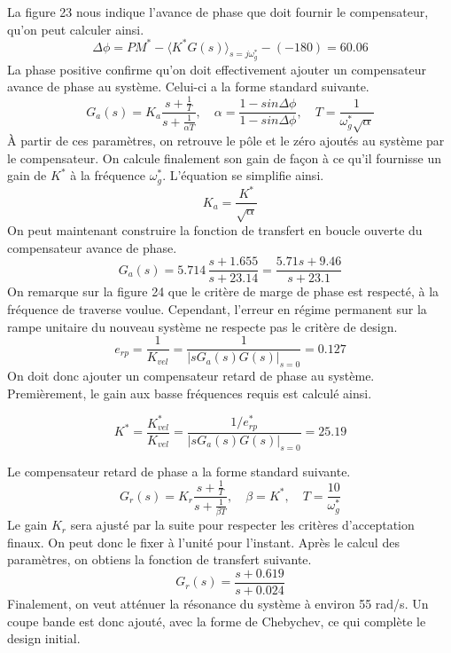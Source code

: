 \documentclass{udes_rapport} %
\begin{document}
La figure 23 nous indique l'avance de phase que doit fournir le compensateur, qu'on peut calculer ainsi.
\[ \Delta \phi = PM^* - \langle K^*G(s)\rangle_{s=j\omega_g^*} -(-180)=60.06\] 
La phase positive confirme qu'on doit effectivement ajouter un compensateur avance de phase au système. Celui-ci a la forme standard suivante.
 \[ G_a(s)=K_a\frac{s+\frac{1}{T}}{s+\frac{1}{\alpha T}}, \quad \alpha = \frac{1-sin\Delta\phi}{1-sin\Delta\phi}, \quad T = \frac{1}{\omega_g^*\sqrt{\alpha}}\]
 À partir de ces paramètres, on retrouve le pôle et le zéro ajoutés au système par le compensateur. On calcule finalement son gain de façon à ce qu'il fournisse un gain de $K^*$ à la fréquence $\omega_g^*$. L'équation se simplifie ainsi.
 \[K_a = \frac{K^*}{\sqrt{\alpha}}\]
On peut maintenant construire la fonction de transfert en boucle ouverte du compensateur avance de phase.
\[ G_a(s) = 5.714\,\frac{s+1.655}{s+23.14} = \frac{5.71s+9.46}{s+23.1} \]
On remarque sur la figure 24 que le critère de marge de phase est respecté, à la fréquence de traverse voulue.
Cependant, l'erreur en régime permanent sur la rampe unitaire du nouveau système ne respecte pas le critère de design.
\[ e_{rp} = \frac{1}{K_{vel}} = \frac{1}{|sG_a(s)G(s)|_{s=0}}=0.127 \]
On doit donc ajouter un compensateur retard de phase au système. Premièrement, le gain aux basse fréquences requis est calculé ainsi.

\[ K^* = \frac{K_{vel}^*}{K_{vel}} = \frac{1/e_{rp}^*}{|sG_a(s)G(s)|_{s=0}} =  25.19\]

Le compensateur retard de phase a la forme standard suivante.
 \[ G_r(s)=K_r\frac{s+\frac{1}{T}}{s+\frac{1}{\beta T}}, \quad \beta = K^*, \quad T = \frac{10}{\omega_g^*}\]
 Le gain $K_r$ sera ajusté par la suite pour respecter les critères d'acceptation finaux. On peut donc le fixer à l'unité pour l'instant. Après le calcul des paramètres, on obtiens la fonction de transfert suivante.
\[ G_r(s) = \frac{s+0.619}{s+0.024} \]
Finalement, on veut atténuer la résonance du système à environ 55 rad/s. Un coupe bande est donc ajouté, avec la forme de Chebychev, ce qui complète le design initial.

\noindent\begin{minipage}{\textwidth}
\begin{minipage}{0.5\textwidth}
\end{minipage} 
\begin{minipage}{0.5\textwidth}
\end{minipage}%

\end{minipage}
\end{document}
